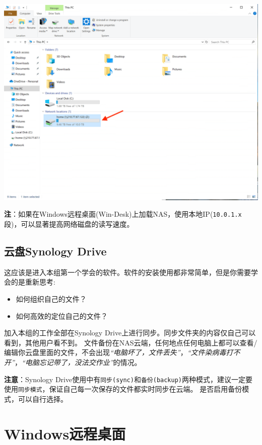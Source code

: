 \documentclass[
]{ctexbook}
\providecommand{\tightlist}{%
  \setlength{\itemsep}{0pt}\setlength{\parskip}{0pt}}
\begin{document}
\begin{itemize}
  \includegraphics{Fig/ch5/win_mapdisk-4.png}
\end{itemize}

\textbf{注}：如果在Windows远程桌面(Win-Desk)上加载NAS，使用本地IP(\texttt{10.0.1.x}段)，可以显著提高网络磁盘的读写速度。

\hypertarget{synology}{%
\subsection{云盘Synology Drive}\label{synology}}

这应该是进入本组第一个学会的软件。软件的安装使用都非常简单，但是你需要学会的是重新思考:

\begin{itemize}
\tightlist
\item
  如何组织自己的文件？
\item
  如何高效的定位自己的文件？
\end{itemize}

加入本组的工作全部在Synology Drive上进行同步。同步文件夹的内容仅自己可以看到，其他用户看不到。
文件备份在NAS云端，任何地点任何电脑上都可以查看/编辑你云盘里面的文件，不会出现\emph{``电脑坏了，文件丢失''}，\emph{``文件染病毒打不开''}，\emph{``电脑忘记带了，没法交作业''}的情况。

\textbf{注意}：Synology Drive使用中有\texttt{同步(sync)}和\texttt{备份(backup)}两种模式，建议一定要使用\texttt{同步模式}，保证自己每一次保存的文件都实时同步在云端。 是否启用备份模式，可以自行选择。

\hypertarget{windowsux8fdcux7a0bux684cux9762}{%
\section{Windows远程桌面}\label{windowsux8fdcux7a0bux684cux9762}}
\end{document}
